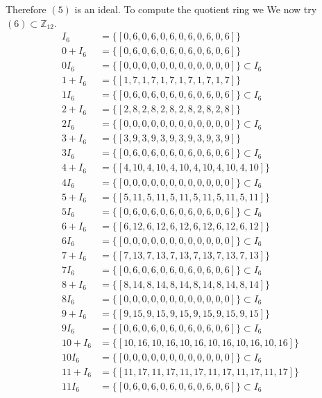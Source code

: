\documentclass[11pt]{amsart}
\begin{document}
Therefore $(5)$ is an ideal.
To compute the quotient ring we
We now try $(6) \subset \mathbb{Z}_{12}$.
\begin{equation*}
\begin{aligned}
I_6 &= \{[0, 6, 0, 6, 0, 6, 0, 6, 0, 6, 0, 6]\} \\
0+ I_6 &= \{[0, 6, 0, 6, 0, 6, 0, 6, 0, 6, 0, 6]\}\\
0 I_6 &= \{[0, 0, 0, 0, 0, 0, 0, 0, 0, 0, 0, 0]\} \subset I_6 \\
1+ I_6 &= \{[1, 7, 1, 7, 1, 7, 1, 7, 1, 7, 1, 7]\}\\
1 I_6 &= \{[0, 6, 0, 6, 0, 6, 0, 6, 0, 6, 0, 6]\} \subset I_6 \\
2+ I_6 &= \{[2, 8, 2, 8, 2, 8, 2, 8, 2, 8, 2, 8]\}\\
2 I_6 &= \{[0, 0, 0, 0, 0, 0, 0, 0, 0, 0, 0, 0]\} \subset I_6 \\
3+ I_6 &= \{[3, 9, 3, 9, 3, 9, 3, 9, 3, 9, 3, 9]\}\\
3 I_6 &= \{[0, 6, 0, 6, 0, 6, 0, 6, 0, 6, 0, 6]\} \subset I_6 \\
4+ I_6 &= \{[4, 10, 4, 10, 4, 10, 4, 10, 4, 10, 4, 10]\}\\
4 I_6 &= \{[0, 0, 0, 0, 0, 0, 0, 0, 0, 0, 0, 0]\} \subset I_6 \\
5+ I_6 &= \{[5, 11, 5, 11, 5, 11, 5, 11, 5, 11, 5, 11]\}\\
5 I_6 &= \{[0, 6, 0, 6, 0, 6, 0, 6, 0, 6, 0, 6]\} \subset I_6 \\
6+ I_6 &= \{[6, 12, 6, 12, 6, 12, 6, 12, 6, 12, 6, 12]\}\\
6 I_6 &= \{[0, 0, 0, 0, 0, 0, 0, 0, 0, 0, 0, 0]\} \subset I_6 \\
7+ I_6 &= \{[7, 13, 7, 13, 7, 13, 7, 13, 7, 13, 7, 13]\}\\
7 I_6 &= \{[0, 6, 0, 6, 0, 6, 0, 6, 0, 6, 0, 6]\} \subset I_6 \\
8+ I_6 &= \{[8, 14, 8, 14, 8, 14, 8, 14, 8, 14, 8, 14]\}\\
8 I_6 &= \{[0, 0, 0, 0, 0, 0, 0, 0, 0, 0, 0, 0]\} \subset I_6 \\
9+ I_6 &= \{[9, 15, 9, 15, 9, 15, 9, 15, 9, 15, 9, 15]\}\\
9 I_6 &= \{[0, 6, 0, 6, 0, 6, 0, 6, 0, 6, 0, 6]\} \subset I_6 \\
10+ I_6 &= \{[10, 16, 10, 16, 10, 16, 10, 16, 10, 16, 10, 16]\}\\
10 I_6 &= \{[0, 0, 0, 0, 0, 0, 0, 0, 0, 0, 0, 0]\} \subset I_6 \\
11+ I_6 &= \{[11, 17, 11, 17, 11, 17, 11, 17, 11, 17, 11, 17]\}\\
11 I_6 &= \{[0, 6, 0, 6, 0, 6, 0, 6, 0, 6, 0, 6]\} \subset I_6 \\
\end{aligned}
\end{equation*}
\end{document}
